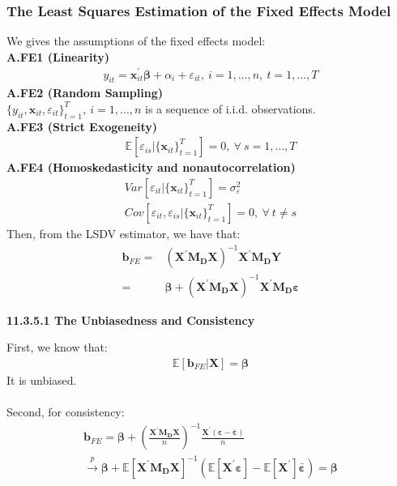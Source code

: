 \documentclass{article}
\begin{document}
\subsubsection{The Least Squares Estimation of the Fixed Effects Model}
We gives the assumptions of the fixed effects model:\\
\textbf{A.FE1 (Linearity)}
	\begin{align*}
		y_{it} = \boldsymbol{x}_{it}^\prime \boldsymbol{\beta} + \alpha_i + \varepsilon_{it},\ i = 1, \ldots, n,\ t = 1, \ldots, T
	\end{align*}
\textbf{A.FE2 (Random Sampling)}\\
$\{ y_{it}, \boldsymbol{x}_{it}, \varepsilon_{it} \}^T_{t=1},\ i = 1, \ldots, n$ is a sequence of i.i.d. observations.\\
\textbf{A.FE3 (Strict Exogeneity)}
	\begin{align*}
		\mathbb{E} [\varepsilon_{is} | \{ \boldsymbol{x}_{it} \}^T_{t=1}] = 0,\ \forall\ s = 1, \ldots, T
	\end{align*}
\textbf{A.FE4 (Homoskedasticity and nonautocorrelation)}
	\begin{align*}
		Var[\varepsilon_{it} | \{ \boldsymbol{x}_{it} \}^T_{t=1}] = \sigma^2_{\varepsilon}\\
		Cov[\varepsilon_{it}, \varepsilon_{is} | \{ \boldsymbol{x}_{it} \}^T_{t=1}] = 0,\ \forall\ t \neq s
	\end{align*}
Then, from the LSDV estimator, we have that:
	\begin{align*}
		\boldsymbol{b}_{FE} = &(\boldsymbol{X}^\prime \boldsymbol{M_D} \boldsymbol{X})^{-1} \boldsymbol{X}^\prime \boldsymbol{M_D} \boldsymbol{Y}\\ = &
		\boldsymbol{\beta} + (\boldsymbol{X}^\prime \boldsymbol{M_D} \boldsymbol{X})^{-1} \boldsymbol{X}^\prime \boldsymbol{M_D} \boldsymbol{\varepsilon} 
	\end{align*}
\centerline{\textbf{11.3.5.1 The Unbiasedness and Consistency}}
First, we know that:
	\begin{align*}
		\mathbb{E} [\boldsymbol{b}_{FE} | \boldsymbol{X}] = \boldsymbol{\beta}
	\end{align*}
It is unbiased.\\\\
Second, for consistency:
	\begin{align*}
		\boldsymbol{b}_{FE} = \boldsymbol{\beta} + (\frac{\boldsymbol{X}^\prime \boldsymbol{M_D} \boldsymbol{X}}{n})^{-1} \frac{\boldsymbol{X}^\prime (\boldsymbol{\varepsilon} - \bar{\boldsymbol{\varepsilon}})}{n}\\
		\xrightarrow{p} \boldsymbol{\beta} + \mathbb{E} [\boldsymbol{X}^\prime \boldsymbol{M_D} \boldsymbol{X}]^{-1} (\mathbb{E} [\boldsymbol{X}^\prime \boldsymbol{\varepsilon} ] - \mathbb{E} [\boldsymbol{X}^\prime] \bar{\boldsymbol{\varepsilon}}) = \boldsymbol{\beta} 
	\end{align*}
\end{document}
